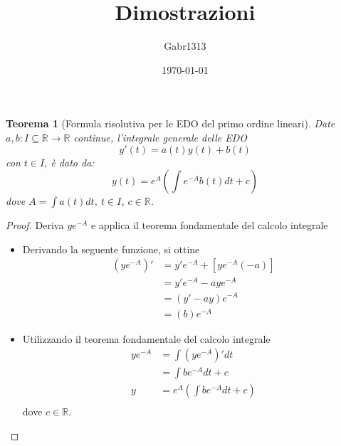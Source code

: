\documentclass[12pt, a4paper]{article}
\title{Dimostrazioni}
\author{Gabr1313}
\date{\today}
\theoremstyle{break}
\newtheorem{theorem}{Teorema} %
\begin{document}
\justify
\sloppy
\maketitle
\listoftheorems

\newpage
{}
\begin{theorem} [Formula risolutiva per le EDO del primo ordine lineari]
	Date $a, b: I \subseteq \mathbb{R} \to \mathbb{R}$ continue,
	l'integrale generale delle EDO
	\[
		y'(t) = a(t) y(t) + b(t)
	\]
	con $t \in I $, è dato da:
	\[
		y(t) = e^A \left( \int e^{-A} b(t) dt + c \right)
	\]
	dove $A = \int a(t) dt$, $t \in I$, $c \in \mathbb{R}$.
\end{theorem}
\begin{proof} Deriva $y e^{-A}$ e applica il teorema fondamentale del calcolo
	integrale
	\begin{itemize}
		\item Derivando la seguente funzione, si ottine
		      \begin{align*}
			      (y e^{-A})' & = y' e^{-A} + [ye^{-A}(-a)] \\
			                  & = y' e^{-A} - aye^{-A}      \\
			                  & = (y' - ay)e^{-A}           \\
			                  & = (b)e^{-A}
		      \end{align*}
		\item Utilizzando il teorema fondamentale del calcolo integrale
		      \begin{align*}
			      y e^{-A} & = \int (y e^{-A})' dt                   \\
			               & = \int be^{-A} dt + c                   \\
			      y        & = e^A \left(\int be^{-A} dt + c \right) \\
		      \end{align*}
		      dove $c \in \mathbb{R}$.
	\end{itemize}
\end{proof}
\end{document}
